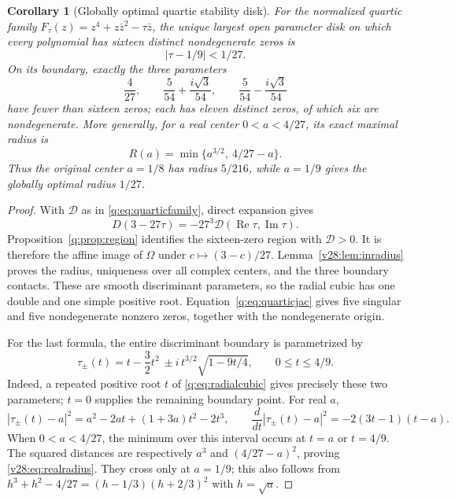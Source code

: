 \documentclass[UTF8,11pt]{ctexart}
\newtheorem{cor}[thm]{Corollary}
\theoremstyle{definition}
\numberwithin{equation}{section}
\DeclareMathOperator{\Rea}{Re}\DeclareMathOperator{\Ima}{Im}
\begin{document}
\begin{cor}[Globally optimal quartic stability disk]
\label{v28:cor:quarticdisk}
For the normalized quartic family
$F_\tau(z)=z^4+z\bar z^2-\tau\bar z$, the unique largest open
parameter disk on which every polynomial has sixteen distinct
nondegenerate zeros is
\begin{equation}\label{v28:eq:quarticdisk}
                         |\tau-1/9|<1/27.
\end{equation}
On its boundary, exactly the three parameters
\[
              \frac4{27},\qquad
              \frac5{54}+\frac{i\sqrt3}{54},\qquad
              \frac5{54}-\frac{i\sqrt3}{54}
\]
have fewer than sixteen zeros; each has eleven distinct zeros,
of which six are nondegenerate.
More generally, for a real center $0<a<4/27$, its exact maximal
radius is
\begin{equation}\label{v28:eq:realradius}
                  R(a)=\min\{a^{3/2},\ 4/27-a\}.
\end{equation}
Thus the original center $a=1/8$ has radius $5/216$, while
$a=1/9$ gives the globally optimal radius $1/27$.
\end{cor}
\begin{proof}
With $\mathcal D$ as in \eqref{q:eq:quarticfamily}, direct expansion gives
\[
                  D(3-27\tau)=-27^3\mathcal D(\Rea\tau,\Ima\tau).
\]
Proposition~\ref{q:prop:region} identifies the sixteen-zero region
with $\mathcal D>0$. It is therefore the affine image of $\Omega$
under $c\mapsto(3-c)/27$. Lemma~\ref{v28:lem:inradius} proves
the radius, uniqueness over all complex centers, and the three
boundary contacts. These are smooth discriminant parameters,
so the radial cubic has one double and one simple positive root.
Equation~\eqref{q:eq:quarticjac} gives five singular and five
nondegenerate nonzero zeros, together with the nondegenerate origin.

For the last formula, the entire discriminant boundary is
parametrized by
\[
 \tau_\pm(t)=t-\frac32t^2
                 \ \pm i\,t^{3/2}\sqrt{1-9t/4},
 \qquad 0\le t\le4/9.
\]
Indeed, a repeated positive root $t$ of
\eqref{q:eq:radialcubic} gives precisely these two parameters;
$t=0$ supplies the remaining boundary point. For real $a$,
\[
 |\tau_\pm(t)-a|^2
 =a^2-2at+(1+3a)t^2-2t^3,
 \qquad
 \frac{d}{dt}|\tau_\pm(t)-a|^2=-2(3t-1)(t-a).
\]
When $0<a<4/27$, the minimum over this interval occurs at
$t=a$ or $t=4/9$. The squared distances are respectively
$a^3$ and $(4/27-a)^2$, proving \eqref{v28:eq:realradius}.
They cross only at $a=1/9$; this also follows from
$h^3+h^2-4/27=(h-1/3)(h+2/3)^2$ with $h=\sqrt a$.
\end{proof}
\end{document}
